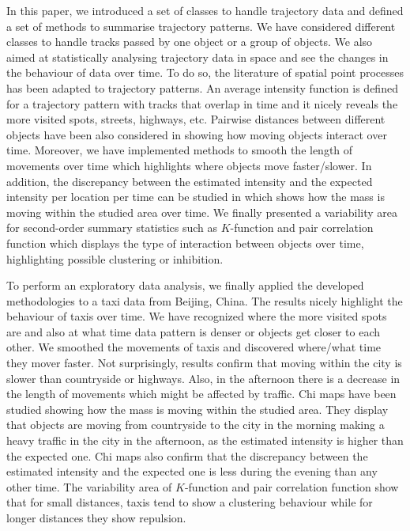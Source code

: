 \documentclass[article]{jss}
\begin{document}
  In this paper, we introduced a set of classes to handle trajectory data and defined a set of methods to summarise trajectory patterns. We have considered different classes to handle tracks passed by one object or a group of objects. We also aimed at statistically analysing trajectory data in space and see the changes in the behaviour of data over time. To do so, the literature of spatial point processes has been adapted to trajectory patterns. An average intensity function is defined for a trajectory pattern with tracks that overlap in time and it nicely reveals the more visited spots, streets, highways, etc. Pairwise distances between different objects have been also considered in  showing how moving objects interact over time. Moreover, we have implemented methods to smooth the length of movements over time which highlights where objects move faster/slower. In addition, the discrepancy between the estimated intensity and the expected intensity per location per time can be studied in  which shows how the mass is moving within the studied area over time. We finally presented a variability area for second-order summary statistics such as $K$-function and pair correlation function which displays the type of interaction between objects over time, highlighting possible clustering or inhibition.
  
  To perform an exploratory data analysis, we finally applied the developed methodologies to a taxi data from Beijing, China. The results nicely highlight the behaviour of taxis over time. We have recognized where the more visited spots are and also at what time data pattern is denser or objects get closer to each other. We smoothed the movements of taxis and discovered where/what time they mover faster. Not surprisingly, results confirm that moving within the city is slower than countryside or highways. Also, in the afternoon there is a decrease in the length of movements which might be affected by traffic. Chi maps have been studied showing how the mass is moving within the studied area. They display that objects are moving from countryside to the city in the morning making a heavy traffic in the city in the afternoon, as the estimated intensity is higher than the expected one. Chi maps also confirm that the  discrepancy between the estimated intensity and the expected one is less during the evening than any other time. The variability area of $K$-function and pair correlation function show that for small distances, taxis tend to show a clustering behaviour while for longer distances they show repulsion.
  
\end{document}

